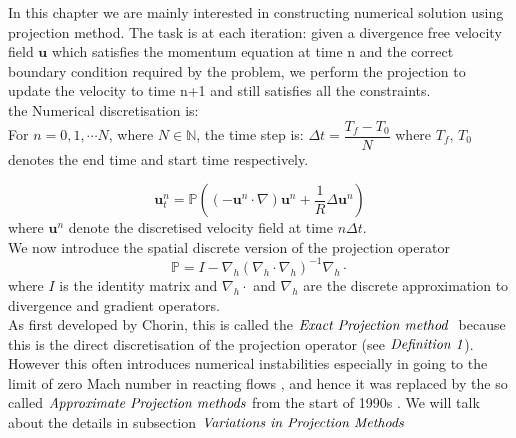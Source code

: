 In this chapter we are mainly interested in constructing numerical solution using projection method. The task is at each iteration: given a divergence free velocity field $\textbf{u}$ which satisfies the momentum equation at time n and the correct boundary condition required by the problem, we perform the projection to update the velocity to time n+1 and still satisfies all the constraints.\\

the Numerical discretisation is:\\
For $n = 0,1,\cdots N$, where $N \in \mathbb{N}$, the time step is: $\Delta t = \dfrac{T_f - T_0}{N}$ where $T_f,\,T_0$ denotes the end time and start time respectively.

\begin{equation}\label{eq:discrete projection on momentum equation}
\textbf{u}^n_t = \mathbb{P} ((-\textbf{u}^{n} \cdot \nabla) \textbf{u}^{n} + \dfrac{1}{R} \Delta \textbf{u}^n)
\end{equation}
where $\textbf{u}^n$ denote the discretised velocity field at time $n\Delta t$.\\
We now introduce the spatial discrete version of the projection operator
\begin{equation}\label{eq: discrete projection opreator}
\mathbb{P} = I - \nabla_h (\nabla_h \cdot \nabla_h)^{-1} \nabla_h \cdot
\end{equation}
where $\textit{I}$ is the identity matrix and $\nabla_h \cdot$ and $\nabla_h$ are the discrete approximation to divergence and gradient operators.\\

As first developed by Chorin, this is called the $\emph{Exact Projection method }$ \cite{chorin1968numerical,almgren1996numerical,almgren2000approximate} because this is the direct discretisation of the projection operator (see $\emph{Definition 1}$). However this often introduces numerical instabilities especially in going to the limit of zero Mach number in reacting flows \cite{almgren1996numerical,almgren2000approximate,lal1993projection,minion1996projection}, and hence it was replaced by the so called $\emph{Approximate Projection methods}$ from the start of 1990s 
\cite{brown2001accurate,almgren1996numerical,almgren2000approximate}. We will talk about the details in subsection $\emph{Variations in Projection Methods}$\\

